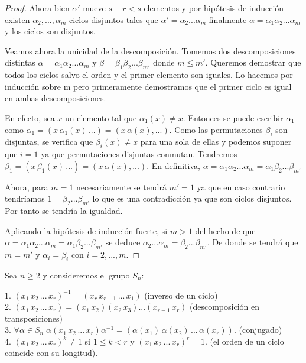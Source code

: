 \begin{proof}
Ahora bien $\alpha'$ mueve $s-r < s$ elementos y por hipótesis de inducción existen $\alpha_2,...,\alpha_m$ ciclos disjuntos tales que $\alpha' = \alpha_2...\alpha_m$ finalmente $\alpha = \alpha_1\alpha_2...\alpha_m$ y los ciclos son disjuntos.

Veamos ahora la unicidad de la descomposición. Tomemos dos descomposiciones distintas $\alpha = \alpha_1\alpha_2...\alpha_m$ y $\beta = \beta_1\beta_2...\beta_{m'}$ donde $m \le m'$. Queremos demostrar que todos los ciclos salvo el orden y el primer elemento son iguales. Lo hacemos por inducción sobre m pero primeramente demostramos que el primer ciclo es igual en ambas descomposiciones.

En efecto, sea $x$ un elemento tal que $\alpha_1(x) \neq x$. Entonces se puede escribir $\alpha_1$ como $\alpha_1 = (x \, \alpha_1(x) \, ...) = (x \, \alpha(x),...)$. Como las permutaciones $\beta_i$ son disjuntas, se verifica que $\beta_i(x) \neq x$ para una sola de ellas y podemos suponer que $i = 1$ ya que permutaciones disjuntas conmutan. Tendremos $\beta_1 = (x \, \beta_1(x) \, ...) = (x \, \alpha(x),...)$. En definitiva, $\alpha = \alpha_1\alpha_2...\alpha_m = \alpha_1\beta_2...\beta_{m'}$

Ahora, para $m = 1$ necesariamente se tendrá $m' = 1$ ya que en caso contrario tendríamos $1 = \beta_2...\beta_{m'}$ lo que es una contradicción ya que son ciclos disjuntos. Por tanto se tendría la igualdad. 

Aplicando la hipótesis de inducción fuerte, si $m > 1$ del hecho de que $\alpha = \alpha_1\alpha_2...\alpha_m = \alpha_1\beta_2...\beta_{m'}$ se deduce $\alpha_2...\alpha_m = \beta_2...\beta_{m'}$. De donde se tendrá que $m = m'$ y $\alpha_i = \beta_i$ con $i=2,...,m$.
\end{proof}

\begin{nprop}\label{proposition:propiedades-ciclos}
Sea $n \ge 2$ y consideremos el grupo $S_n$:

1. $(x_1 \, x_2 \, ... \, x_r)^{-1} = (x_r \, x_{r-1} \, ... \, x_1)$ (inverso de un ciclo)\\
2. $(x_1 \, x_2 \, ... \, x_r) = (x_1 \, x_2)(x_2 \, x_3)...(x_{r-1} \, x_r)$ (descomposición en transposiciones)\\
3. $\forall \alpha \in S_n \; \alpha (x_1 \, x_2 \, ... \, x_r) \alpha^{-1} = (\alpha(x_1) \, \alpha(x_2) \, ... \, \alpha(x_r))$. (conjugado)\\
4. $(x_1 \, x_2 \, ... \, x_r)^k \neq 1$ si $1 \le k < r$ y $(x_1 \, x_2 \, ... \, x_r)^r = 1$. (el orden de un ciclo coincide con su longitud).
\end{nprop}

